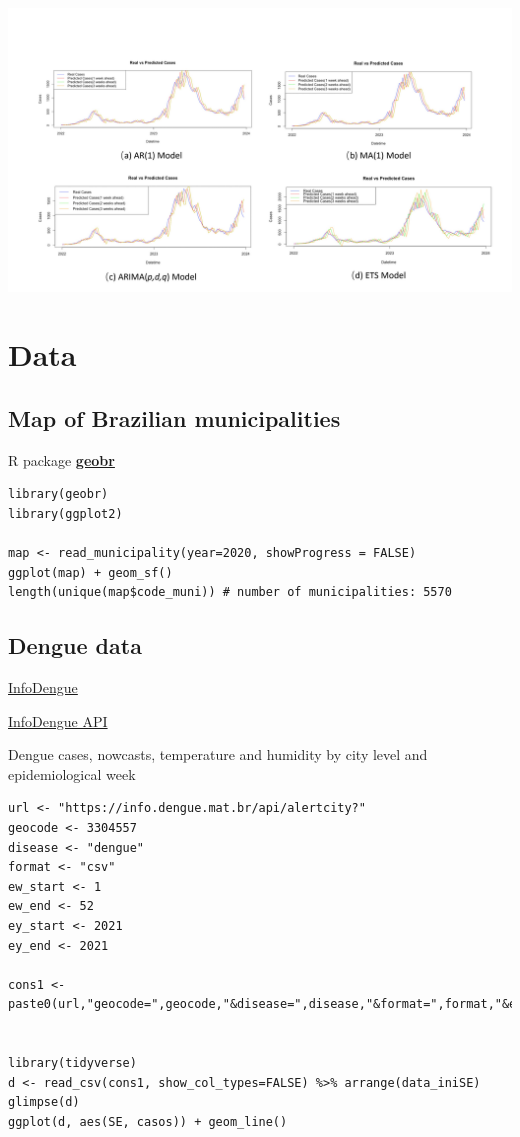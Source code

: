 \documentclass[
  letterpaper,
  DIV=11,
  numbers=noendperiod]{scrreprt}
\begin{document}
\includegraphics[width=6.25in,height=\textheight]{img/denguebrazil-realvsforecasts.jpg}

\hypertarget{data-2}{%
\chapter{Data}\label{data-2}}

\hypertarget{map-of-brazilian-municipalities}{%
\section{Map of Brazilian
municipalities}\label{map-of-brazilian-municipalities}}

R package
\href{https://cran.r-project.org/web/packages/geobr/vignettes/intro_to_geobr.html}{\textbf{geobr}}

\begin{verbatim}
library(geobr)
library(ggplot2)

map <- read_municipality(year=2020, showProgress = FALSE)
ggplot(map) + geom_sf()
length(unique(map$code_muni)) # number of municipalities: 5570
\end{verbatim}

\hypertarget{dengue-data}{%
\section{Dengue data}\label{dengue-data}}

\href{https://info.dengue.mat.br/}{InfoDengue}

\href{https://info.dengue.mat.br/services/tutorial/R}{InfoDengue API}

Dengue cases, nowcasts, temperature and humidity by city level and
epidemiological week

\begin{verbatim}
url <- "https://info.dengue.mat.br/api/alertcity?"
geocode <- 3304557
disease <- "dengue"
format <- "csv"
ew_start <- 1
ew_end <- 52
ey_start <- 2021
ey_end <- 2021

cons1 <- paste0(url,"geocode=",geocode,"&disease=",disease,"&format=",format,"&ew_start=",ew_start,"&ew_end=",ew_end,"&ey_start=",ey_start,"&ey_end=",ey_end)


library(tidyverse)
d <- read_csv(cons1, show_col_types=FALSE) %>% arrange(data_iniSE)
glimpse(d)
ggplot(d, aes(SE, casos)) + geom_line()
\end{verbatim}
\end{document}
